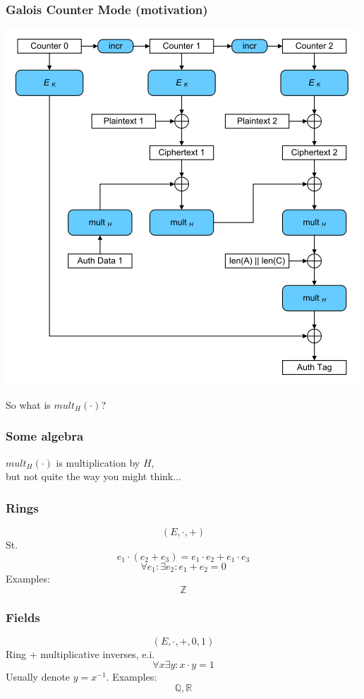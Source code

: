 \documentclass{beamer}
\begin{document}
\begin{frame}
\frametitle{Galois Counter Mode (motivation)}
\begin{center}
\includegraphics[height=0.7\textheight]{mode-gcm.png}
\end{center}
So what is $mult_{H}(\cdot)$?
\end{frame}

\begin{frame}
\frametitle{Some algebra}
\begin{center}
$mult_{H}(\cdot)$ is multiplication by $H$, \\
but not quite the way you might think...
\end{center}
\end{frame}

\begin{frame}
\frametitle{Rings}
\[
    (E, \cdot, +)
\]
St.
\[
    e_{1} \cdot (e_{2} + e_{3})
    =
    e_{1} \cdot e_{2}
    +
    e_{1} \cdot e_{3}
\]
\[
    \forall e_{1} :
    \exists e_{2} :
    e_{1} + e_{2} = 0
\]
Examples:
\[
    \mathbb{Z}
\]
\end{frame}

\begin{frame}
\frametitle{Fields}
\[
    (E, \cdot, +, 0, 1)
\]
Ring + multiplicative inverses, e.i.
\[
    \forall x \exists y : x \cdot y = 1
\]
Usually denote $y = x^{-1}$. Examples:
\[
    \mathbb{Q}, \mathbb{R}
\]
\end{frame}
\end{document}
